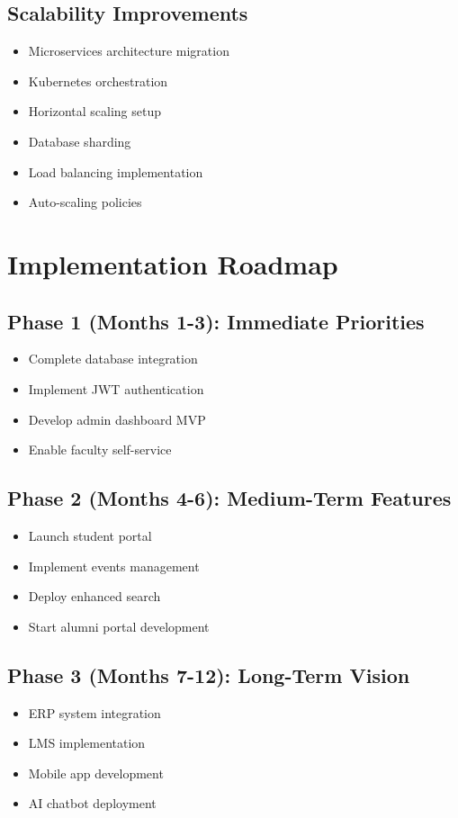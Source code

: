 \documentclass[12pt,a4paper]{report}
\begin{document}
\subsection{Scalability Improvements}

\begin{itemize}
    \item Microservices architecture migration
    \item Kubernetes orchestration
    \item Horizontal scaling setup
    \item Database sharding
    \item Load balancing implementation
    \item Auto-scaling policies
\end{itemize}

\section{Implementation Roadmap}

\subsection{Phase 1 (Months 1-3): Immediate Priorities}
\begin{itemize}
    \item Complete database integration
    \item Implement JWT authentication
    \item Develop admin dashboard MVP
    \item Enable faculty self-service
\end{itemize}

\subsection{Phase 2 (Months 4-6): Medium-Term Features}
\begin{itemize}
    \item Launch student portal
    \item Implement events management
    \item Deploy enhanced search
    \item Start alumni portal development
\end{itemize}

\subsection{Phase 3 (Months 7-12): Long-Term Vision}
\begin{itemize}
    \item ERP system integration
    \item LMS implementation
    \item Mobile app development
    \item AI chatbot deployment
\end{itemize}
\end{document}
